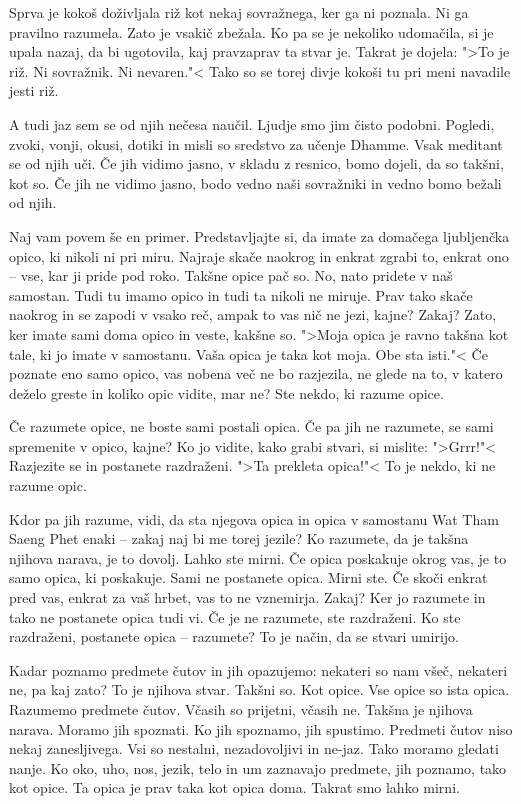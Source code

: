 Sprva je kokoš doživljala riž kot nekaj sovražnega, ker ga ni poznala. Ni ga pravilno razumela. Zato je vsakič zbežala. Ko pa se je nekoliko udomačila, si je upala nazaj, da bi ugotovila, kaj pravzaprav ta stvar je. Takrat je dojela: ">To je riž. Ni sovražnik. Ni nevaren."< Tako so se torej divje kokoši tu pri meni navadile jesti riž.

A tudi jaz sem se od njih nečesa naučil. Ljudje smo jim čisto podobni. Pogledi, zvoki, vonji, okusi, dotiki in misli so sredstvo za učenje Dhamme. Vsak meditant se od njih uči. Če jih vidimo jasno, v skladu z resnico, bomo dojeli, da so takšni, kot so. Če jih ne vidimo jasno, bodo vedno naši sovražniki in vedno bomo bežali od njih.

\clearpage


Naj vam povem še en primer. Predstavljajte si, da imate za domačega ljubljenčka opico, ki nikoli ni pri miru. Najraje skače naokrog in enkrat zgrabi to, enkrat ono – vse, kar ji pride pod roko. Takšne opice pač so. No, nato pridete v naš samostan. Tudi tu imamo opico in tudi ta nikoli ne miruje. Prav tako skače naokrog in se zapodi v vsako reč, ampak to vas nič ne jezi, kajne? Zakaj? Zato, ker imate sami doma opico in veste, kakšne so. ">Moja opica je ravno takšna kot tale, ki jo imate v samostanu. Vaša opica je taka kot moja. Obe sta isti."< Če poznate eno samo opico, vas nobena več ne bo razjezila, ne glede na to, v katero deželo greste in koliko opic vidite, mar ne? Ste nekdo, ki razume opice.

Če razumete opice, ne boste sami postali opica. Če pa jih ne razumete, se sami spremenite v opico, kajne? Ko jo vidite, kako grabi stvari, si mislite: ">Grrr!"< Razjezite se in postanete razdraženi. ">Ta prekleta opica!"< To je nekdo, ki ne razume opic.

Kdor pa jih razume, vidi, da sta njegova opica in opica v samostanu Wat Tham Saeng Phet enaki – zakaj naj bi me torej jezile? Ko razumete, da je takšna njihova narava, je to dovolj. Lahko ste mirni. Če opica poskakuje okrog vas, je to samo opica, ki poskakuje. Sami ne postanete opica. Mirni ste. Če skoči enkrat pred vas, enkrat za vaš hrbet, vas to ne vznemirja. Zakaj? Ker jo razumete in tako ne postanete opica tudi vi. Če je ne razumete, ste razdraženi. Ko ste razdraženi, postanete opica – razumete? To je način, da se stvari umirijo.

Kadar poznamo predmete čutov in jih opazujemo: nekateri so nam všeč, nekateri ne, pa kaj zato? To je njihova stvar. Takšni so. Kot opice. Vse opice so ista opica. Razumemo predmete čutov. Včasih so prijetni, včasih ne. Takšna je njihova narava. Moramo jih spoznati. Ko jih spoznamo, jih spustimo. Predmeti čutov niso nekaj zanesljivega. Vsi so nestalni, nezadovoljivi in ne-jaz. Tako moramo gledati nanje. Ko oko, uho, nos, jezik, telo in um zaznavajo predmete, jih poznamo, tako kot opice. Ta opica je prav taka kot opica doma. Takrat smo lahko mirni.

